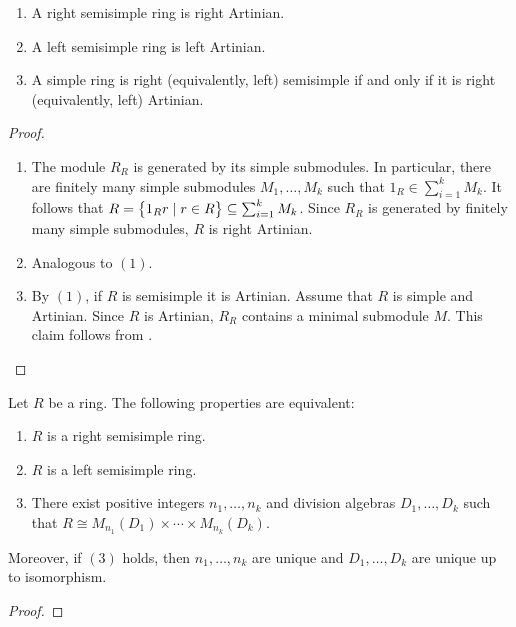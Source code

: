 \documentclass[11pt,a4paper]{article}
\begin{document}
\begin{lemma} \phantom{}
  \begin{enumerate}
    \item[(1)] A right semisimple ring is right Artinian.
    \item[(2)] A left semisimple ring is left Artinian.
    \item[(3)] A simple ring is right (equivalently, left) semisimple
      if and only if it is right (equivalently, left) Artinian.
  \end{enumerate}
\end{lemma}
\begin{proof} \phantom{}
  \begin{enumerate}
    \item[(1)] The module $R_R$ is generated by its simple submodules.
      In particular, there are finitely many simple submodules
      $M_1,\dots,M_k$ such that $1_R \in \sum_{i=1}^{k} M_k$.
      It follows that
      $R = \left\{1_R r \mid r \in R\right\} \subseteq \sum_{i=1}^{k} M_k$.
      Since $R_R$ is generated by finitely many simple submodules,
      $R$ is right Artinian.
    \item[(2)] Analogous to $(1)$.
    \item[(3)] By $(1)$, if $R$ is semisimple it is Artinian.
      Assume that $R$ is simple and Artinian.
      Since $R$ is Artinian, $R_R$ contains a minimal submodule $M$.
      This claim follows from .
  \end{enumerate}
\end{proof}

\begin{theorem}
  Let $R$ be a ring.
  The following properties are equivalent:
  \begin{enumerate}
    \item[(1)] $R$ is a right semisimple ring.
    \item[(2)] $R$ is a left semisimple ring.
    \item[(3)] There exist positive integers $n_1,\dots,n_k$
      and division algebras $D_1,\dots,D_k$ such that
      $R \cong M_{n_1}(D_1) \times \cdots \times M_{n_k}(D_k)$.
  \end{enumerate}
  Moreover, if $(3)$ holds, then $n_1,\dots,n_k$ are unique and
  $D_1,\dots,D_k$ are unique up to isomorphism.
\end{theorem}
\begin{proof}
  
\end{proof}
\end{document}
